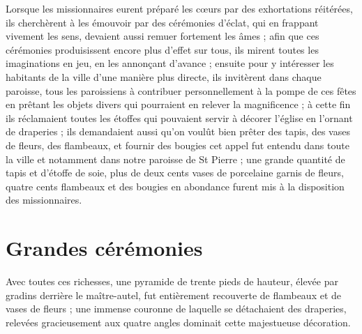 \documentclass[11pt,a4paper]{report}
\begin{document}
Lorsque les missionnaires eurent préparé les cœurs par des exhortations réitérées, ils cherchèrent à les émouvoir par des cérémonies d'éclat, qui en frappant vivement les sens, devaient aussi remuer fortement les âmes ; afin que ces cérémonies produisissent encore plus d'effet sur tous, ils mirent toutes les imaginations en jeu, en les annonçant d'avance ; ensuite pour y intéresser les habitants de la ville d'une manière plus directe, ils invitèrent dans chaque paroisse, tous les paroissiens à contribuer personnellement à la pompe de ces fêtes en prêtant les objets divers qui pourraient en relever la magnificence ; à cette fin ils réclamaient toutes les étoffes qui pouvaient servir à décorer l'église en l'ornant de draperies ; ils demandaient aussi qu'on voulût bien prêter des tapis, des vases de fleurs, des flambeaux, et fournir des bougies cet appel fut entendu dans toute la ville et notamment dans notre paroisse de St Pierre ; une grande quantité de tapis et d'étoffe de soie, plus de deux cents vases de porcelaine garnis de fleurs, quatre cents flambeaux et des bougies en abondance furent mis à la disposition des missionnaires.

\section*{Grandes cérémonies}

Avec toutes ces richesses, une pyramide de trente pieds de hauteur, élevée par gradins derrière le maître-autel, fut entièrement recouverte de flambeaux et de vases de fleurs ; une immense couronne de laquelle se détachaient des draperies, relevées gracieusement aux quatre angles dominait cette majestueuse décoration.
\end{document}
